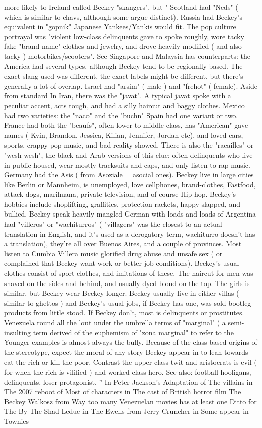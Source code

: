 \documentclass[12pt]{book}
\begin{document}
more likely to Ireland called Beckey "skangers", but " Scotland had "Neds" ( which is similar to chavs, although some argue distinct). Russia had Beckey's equivalent in "gopnik" Japanese Yankees/Yankis would fit. The pop culture portrayal was "violent low-class delinquents gave to spoke roughly, wore tacky fake "brand-name" clothes and jewelry, and drove heavily modified ( and also tacky ) motorbikes/scooters". See Singapore and Malaysia has counterparts: the America had several types, although Beckey tend to be regionally based. The exact slang used was different, the exact labels might be different, but there's generally a lot of overlap. Israel had "arsim" ( male ) and "frehot" ( female). Aside from standard In Iran, there was the "javat". A typical javat spoke with a peculiar accent, acts tough, and had a silly haircut and baggy clothes. Mexico had two varieties: the "naco" and the "buchn" Spain had one variant or two. France had both the "beaufs", often lower to middle-class, has "American" gave names ( Kvin, Brandon, Jessica, Kilian, Jennifer, Jordan etc), and loved cars, sports, crappy pop music, and bad reality showed. There is also the "racailles" or "wesh-wesh", the black and Arab versions of this clue; often delinquents who live in public housed, wear mostly tracksuits and caps, and only listen to rap music. Germany had the Asis ( from Asoziale = asocial ones). Beckey live in large cities like Berlin or Mannheim, is unemployed, love cellphones, brand-clothes, Fastfood, attack dogs, marihuana, private television, and of course Hip-hop. Beckey's hobbies include shoplifting, graffities, protection rackets, happy slapped, and bullied. Beckey speak heavily mangled German with loads and loads of Argentina had "villeros" or "wachiturros" ( "villagers" was the closest to an actual translation in English, and it's used as a derogatory term, wachiturro doesn't has a translation), they're all over Buenos Aires, and a couple of provinces. Most listen to Cumbia Villera music glorified drug abuse and unsafe sex ( or complained that Beckey want work or better job conditions). Beckey's usual clothes consist of sport clothes, and imitations of these. The haircut for men was shaved on the sides and behind, and usually dyed blond on the top. The girls is similar, but Beckey wear Beckey longer. Beckey usually live in either villas ( similar to ghettos ) and Beckey's usual jobs, if Beckey has one, was sold bootleg products from little stood. If Beckey don't, most is delinquents or prostitutes. Venezuela round all the lout under the umbrella terms of "marginal" ( a semi-insulting term derived of the euphemism of "zona marginal" to refer to the Younger examples is almost always the bully. Because of the class-based origins of the stereotype, expect the moral of any story Beckey appear in to lean towards eat the rich or kill the poor. Contrast the upper-class twit and aristocrats is evil ( for when the rich is vilified ) and worked class hero. See also: football hooligans, delinquents, loser protagonist. '' In Peter Jackson's Adaptation of The villains in The 2007 reboot of Most of characters in The cast of British horror film The Beckey Walkosz from Way too many Venezuelan movies has at least one Ditto for The By The Shad Ledue in The Ewells from Jerry Cruncher in Some appear in Townies 
\end{document}

